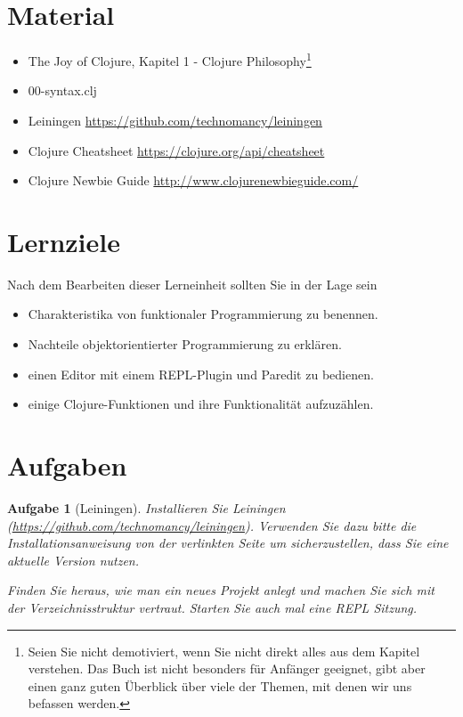 \documentclass[11pt,a4paper]{article}
\newcounter{numb}
\theoremstyle{break}
\newtheorem{aufgabe}{Aufgabe}[numb]
\begin{document}
	\section{Material} 
	
	\begin{itemize}
		\item The Joy of Clojure, Kapitel 1 - Clojure Philosophy\footnote{Seien Sie nicht demotiviert, wenn Sie nicht direkt alles aus dem Kapitel verstehen. Das Buch ist nicht besonders f\"ur Anf\"anger geeignet, gibt aber einen ganz guten \"Uberblick \"uber viele der Themen, mit denen wir uns befassen werden.}
		\item 00-syntax.clj
		\item Leiningen \url{https://github.com/technomancy/leiningen}
		\item Clojure Cheatsheet \url{https://clojure.org/api/cheatsheet}
		\item Clojure Newbie Guide \url{http://www.clojurenewbieguide.com/}
	\end{itemize}
	
	
	\section{Lernziele}
	
	Nach dem Bearbeiten dieser Lerneinheit sollten Sie in der Lage sein
	
	\begin{itemize}
		\item Charakteristika von funktionaler Programmierung zu benennen.
		\item Nachteile objektorientierter Programmierung zu erkl\"aren.
		\item einen Editor mit einem REPL-Plugin und Paredit zu bedienen.
		\item einige Clojure-Funktionen und ihre Funktionalität aufzuzählen.
	\end{itemize}
	
	\section{Aufgaben}
	
	
	\begin{aufgabe}[Leiningen]
		Installieren Sie Leiningen (\url{https://github.com/technomancy/leiningen}).
		Verwenden Sie dazu bitte die Installationsanweisung von der verlinkten Seite
		um sicherzustellen, dass Sie eine aktuelle Version nutzen.
		
		Finden Sie heraus, wie man ein neues Projekt anlegt
		und machen Sie sich mit der Ver\-zeich\-nis\-struk\-tur vertraut.
		Starten Sie auch mal eine REPL Sitzung.
	\end{aufgabe}
	
\end{document}
